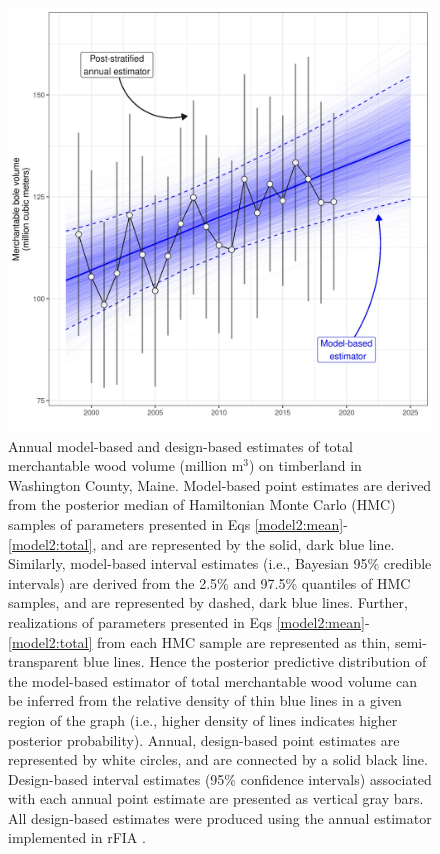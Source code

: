 \documentclass[11pt]{article}
\begin{document}
\begin{figure}[t!]
    \centering
    \includegraphics[width=5.5in]{figure4.jpg}
    \caption{Annual model-based and design-based estimates of total merchantable wood volume (million $\mathrm{m}^3$) on timberland in Washington County, Maine. Model-based point estimates are derived from the posterior median of Hamiltonian Monte Carlo (HMC) samples of parameters presented in Eqs \ref{model2:mean}-\ref{model2:total}, and are represented by the solid, dark blue line. Similarly, model-based interval estimates (i.e., Bayesian 95\% credible intervals) are derived from the 2.5\% and 97.5\% quantiles of HMC samples, and are represented by dashed, dark blue lines. Further, realizations of parameters presented in Eqs \ref{model2:mean}-\ref{model2:total} from each HMC sample are represented as thin, semi-transparent blue lines. Hence the posterior predictive distribution of the model-based estimator of total merchantable wood volume can be inferred from the relative density of thin blue lines in a given region of the graph (i.e., higher density of lines indicates higher posterior probability). Annual, design-based point estimates are represented by white circles, and are connected by a solid black line. Design-based interval estimates (95\% confidence intervals) associated with each annual point estimate are presented as vertical gray bars. All design-based estimates were produced using the annual estimator implemented in rFIA \citep{stanke2020rfia}. }
    \label{fig:volume}
\end{figure}
\end{document}
